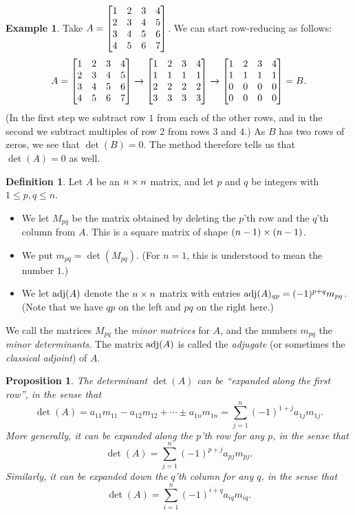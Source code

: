 \documentclass[reqno]{amsart}
\newtheorem{proposition}[theorem]{Proposition}
\theoremstyle{definition}
\newtheorem{definition}[theorem]{Definition}
\newtheorem{example}[theorem]{Example}
\newcommand{\dfn}[1]{\emph{{#1}}\index{#1}}
\begin{document}
\begin{example}\label{eg-det-ro-ii}
 Take $A=\left[\begin{matrix} 1&2&3&4 \\ 2&3&4&5 \\ 3&4&5&6 \\ 4&5&6&7 \end{matrix}\right]$.  We can
 start row-reducing as follows:
 \[ A =
  \left[\begin{matrix} 1&2&3&4 \\
       2&3&4&5 \\
       3&4&5&6 \\
       4&5&6&7 \end{matrix}\right]
  \xrightarrow{}
  \left[\begin{matrix} 1&2&3&4 \\
       1&1&1&1 \\
       2&2&2&2 \\
       3&3&3&3 \end{matrix}\right]
  \xrightarrow{}
  \left[\begin{matrix} 1&2&3&4 \\
       1&1&1&1 \\
       0&0&0&0 \\
       0&0&0&0 \end{matrix}\right]
  = B.
 \]
 (In the first step we subtract row $1$ from each of the other rows,
 and in the second we subtract multiples of row $2$ from rows $3$ and
 $4$.)  As $B$ has two rows of zeros, we see that $\det(B)=0$.  The
 method therefore tells us that $\det(A)=0$ as well.
\end{example}

\begin{definition}\label{defn-minors-pre}
 Let $A$ be an $n\times n$ matrix, and let $p$ and $q$ be integers with
 $1\leq p,q\leq n$.
 \begin{itemize}
  \item[(a)] We let $M_{pq}$ be the matrix obtained by deleting the
   $p$'th row and the $q$'th column from $A$.  This is a square matrix
   of shape $(n-1)\times(n-1)$.
  \item[(b)] We put $m_{pq}=\det(M_{pq})$.
   (For $n = 1$, this is understood to mean the number $1$.)
  \item[(c)] We let $\operatorname{adj}(A)$ denote the $n\times n$ matrix with entries
   $\operatorname{adj}(A)_{qp}=(-1)^{p+q}m_{pq}$.  (Note that we have $qp$ on the
   left and $pq$ on the right here.)
 \end{itemize}
 We call the matrices $M_{pq}$ the \emph{minor matrices} for $A$, and
 the numbers $m_{pq}$ the \emph{minor determinants}.  The matrix
 $\operatorname{adj}(A)$ is called the \dfn{adjugate} (or sometimes the
 \dfn{classical adjoint}) of $A$.
\end{definition}

\begin{proposition}\label{prop-det-expand-pre}
 The determinant $\det(A)$ can be ``expanded along the first row'', in
 the sense that
 \[ \det(A) = a_{11}m_{11} - a_{12}m_{12} + \dotsb \pm a_{1n}m_{1n}
            = \sum_{j=1}^n (-1)^{1+j} a_{1j}m_{1j}.
 \]
 More generally, it can be expanded along the $p$'th row for any $p$,
 in the sense that
 \[ \det(A) = \sum_{j=1}^n (-1)^{p+j} a_{pj}m_{pj}. \]
 Similarly, it can be expanded down the $q$'th column for any $q$,
 in the sense that
 \[ \det(A) = \sum_{i=1}^n (-1)^{i+q} a_{iq}m_{iq}. \]
\end{proposition}
\end{document}
